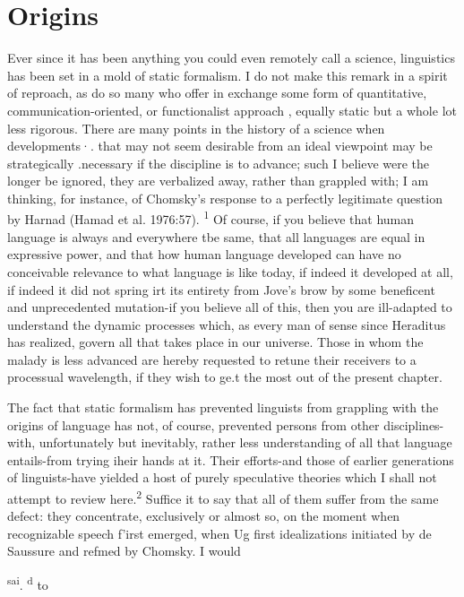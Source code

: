 \chapter{Origins}

Ever since it has been anything you could even remotely call a science, linguistics has been set in a mold of static formalism. I do not make this remark in a spirit of reproach, as do so many who offer in exchange some form of quantitative, communication-oriented, or functionalist approach , equally static but a whole lot less rigorous. There are many points in the history of a science when developments·. that may not seem desirable from an ideal viewpoint may be strategi\-cally .necessary if the discipline is to advance; such I believe were the
longer be ignored, they are verbalized away, rather than grappled with; I am thinking, for instance, of Chomsky's response to a perfectly legitimate question by Harnad (Hamad et al. 1976:57). \textsuperscript{1} Of course, if you believe that human language is always and everywhere tbe same, that all languages are equal in expressive power, and that how human language developed can have no conceivable relevance to what language is like today, if indeed it developed at all, if indeed it did not spring irt its entirety from Jove's brow by some beneficent and unprecedented mutation-if you believe all of this, then you are ill-adapted to under\-stand the dynamic processes which, as every man of sense since Hera\-ditus has realized, govern all that takes place in our universe. Those in whom the malady is less advanced are hereby requested to retune their receivers to a processual wavelength, if they wish to ge.t the most out of the present chapter.

The fact that static formalism has prevented linguists from grappling with the origins of language has not, of course, prevented persons from other disciplines-with, unfortunately but inevitably, rather less understanding of all that language entails-from trying iheir hands at it. Their efforts-and those of earlier generations of linguists-have yielded a host of purely speculative theories which I shall not attempt to review here.\textsuperscript{2} Suffice it to say that all of them suffer from the same defect: they concentrate, exclusively or almost so, on the moment when recognizable speech f'irst emerged, when Ug first
idealizations initiated by de Saussure and refmed by Chomsky. I would

\textsuperscript{sa}\textsuperscript{i}. \textsuperscript{d} to


